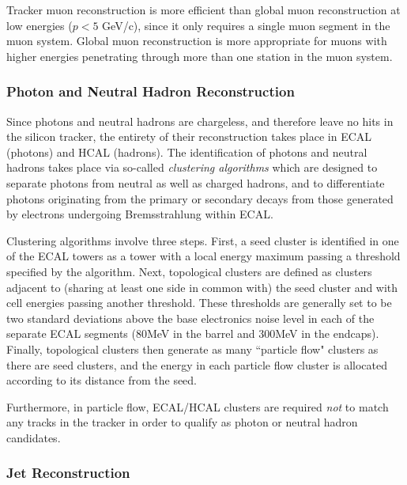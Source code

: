 Tracker muon reconstruction is more efficient than global muon reconstruction at low energies ($p < 5$ GeV/c), since it only requires a single muon segment in the muon system. Global muon reconstruction is more appropriate for muons with higher energies penetrating through more than one station in the muon system.


\subsubsection{Photon and Neutral Hadron Reconstruction}

Since photons and neutral hadrons are chargeless, and therefore leave no hits in the silicon tracker, the entirety of their reconstruction takes place in ECAL (photons) and HCAL (hadrons). The identification of photons and neutral hadrons takes place via so-called \emph{clustering algorithms} which are designed to separate photons from neutral as well as charged hadrons, and to differentiate photons originating from the primary or secondary decays from those generated by electrons undergoing Bremsstrahlung within ECAL.

Clustering algorithms involve three steps. First, a seed cluster is identified in one of the ECAL towers as a tower with a local energy maximum passing a threshold specified by the algorithm. Next, topological clusters are defined as clusters adjacent to (sharing at least one side in common with) the seed cluster and with cell energies passing another threshold. These thresholds are generally set to be two standard deviations above the base electronics noise level in each of the separate ECAL segments (80MeV in the barrel and 300MeV in the endcaps). Finally, topological clusters then generate as many ``particle flow" clusters as there are seed clusters, and the energy in each particle flow cluster is allocated according to its distance from the seed. 

Furthermore, in particle flow, ECAL/HCAL clusters are required \emph{not} to match any tracks in the tracker in order to qualify as photon or neutral hadron candidates.


\subsubsection{Jet Reconstruction}

